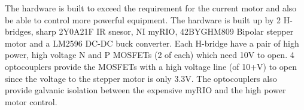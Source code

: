 The hardware is built to exceed the requirement for the current motor and also be able to control more powerful equipment. \newline
The hardware is built up by 2 H-bridges, sharp 2Y0A21F IR snesor, NI myRIO, 42BYGHM809 Bipolar stepper motor and a LM2596 DC-DC buck converter. 
Each H-bridge have a pair of high power, high voltage N and P MOSFETs (2 of each) which need 10V to open. 4 optocouplers provide the MOSFETs with a high voltage line (of 10+V) to open since the voltage to the stepper motor is only 3.3V. The optocouplers also provide galvanic isolation between the expensive myRIO and the high power motor control. %
